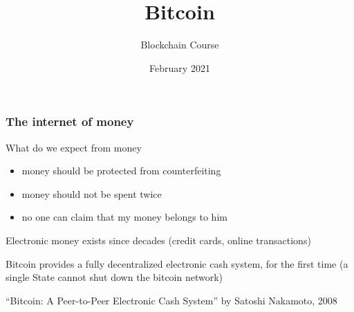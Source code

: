 \documentclass[11pt]{beamer}  %
\subtitle{Blockchain Course}
\title{Bitcoin}
\institute{Universit\`a di Verona, Italy}
\date{February 2021}
\begin{document}
\begin{frame}
  \titlepage
\end{frame}

\begin{frame}
  \frametitle{The internet of money}

  \begin{greenbox}{What do we expect from money}
    \begin{itemize}
    \item money should be protected from counterfeiting
    \item money should not be spent twice
    \item no one can claim that my money belongs to him
    \end{itemize}
  \end{greenbox}

  \bigskip

  Electronic money exists since decades (credit cards, online transactions)

  \bigskip

  \begin{greenbox}{}
    Bitcoin provides a \alert{fully decentralized} electronic cash system, for the first time
    (a single State cannot shut down the bitcoin network)
  \end{greenbox}

  \bigskip

  ``Bitcoin: A Peer-to-Peer Electronic Cash System'' by Satoshi Nakamoto, 2008

\end{frame}
\end{document}
